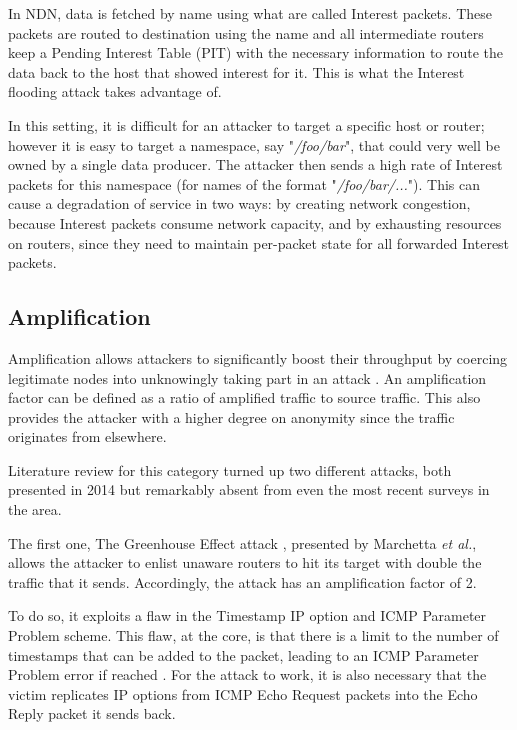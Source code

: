 \documentclass[conference]{IEEEtran}
\begin{document}
In NDN, data is fetched by name using what are called Interest packets. These packets are routed to destination using the name and all intermediate routers keep a Pending Interest Table (PIT) with the necessary information to route the data back to the host that showed interest for it. This is what the Interest flooding attack takes advantage of.

In this setting, it is difficult for an attacker to target a specific host or router; however it is easy to target a namespace, say "\textit{/foo/bar}", that could very well be owned by a single data producer. The attacker then sends a high rate of Interest packets for this namespace (for names of the format "\textit{/foo/bar/...}"). This can cause a degradation of service in two ways: by creating network congestion, because Interest packets consume network capacity, and by exhausting resources on routers, since they need to maintain per-packet state for all forwarded Interest packets.

\subsection{Amplification}
Amplification allows attackers to significantly boost their throughput by coercing legitimate nodes into unknowingly taking part in an attack \cite{Krupp:Scan}. An amplification factor can be defined as a ratio of amplified traffic to source traffic. This also provides the attacker with a higher degree on anonymity since the traffic originates from elsewhere.

Literature review for this category turned up two different attacks, both presented in 2014 but remarkably absent from even the most recent surveys in the area.

The first one, The Greenhouse Effect attack \cite{GreenhouseEffect:Marchetta}, presented by Marchetta \textit{et al.}, allows the attacker to enlist unaware routers to hit its target with double the traffic that it sends. Accordingly, the attack has an amplification factor of 2.

To do so, it exploits a flaw in the Timestamp IP option and ICMP Parameter Problem scheme. This flaw, at the core, is that there is a limit to the number of timestamps that can be added to the packet, leading to an ICMP Parameter Problem error if reached \cite{GreenhouseEffect:Marchetta}. For the attack to work, it is also necessary that the victim replicates IP options from ICMP Echo Request packets into the Echo Reply packet it sends back.
\end{document}
